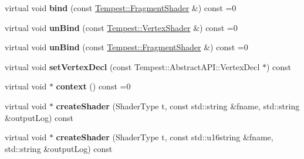 \begin{DoxyCompactItemize}
\item 
\hypertarget{class_tempest_1_1_abstract_shading_lang_accc0e1d115d2be9b627115e394c124c5}{virtual void {\bfseries bind} (const \hyperlink{class_tempest_1_1_fragment_shader}{Tempest\+::\+Fragment\+Shader} \&) const =0}\label{class_tempest_1_1_abstract_shading_lang_accc0e1d115d2be9b627115e394c124c5}

\item 
\hypertarget{class_tempest_1_1_abstract_shading_lang_a9b79bf98a809156da16fa6ad99fddc25}{virtual void {\bfseries un\+Bind} (const \hyperlink{class_tempest_1_1_vertex_shader}{Tempest\+::\+Vertex\+Shader} \&) const =0}\label{class_tempest_1_1_abstract_shading_lang_a9b79bf98a809156da16fa6ad99fddc25}

\item 
\hypertarget{class_tempest_1_1_abstract_shading_lang_a143ac0075977399a8613974446fcefe8}{virtual void {\bfseries un\+Bind} (const \hyperlink{class_tempest_1_1_fragment_shader}{Tempest\+::\+Fragment\+Shader} \&) const =0}\label{class_tempest_1_1_abstract_shading_lang_a143ac0075977399a8613974446fcefe8}

\item 
\hypertarget{class_tempest_1_1_abstract_shading_lang_a58477d41043ece8bab348cb84b986ab2}{virtual void {\bfseries set\+Vertex\+Decl} (const Tempest\+::\+Abstract\+A\+P\+I\+::\+Vertex\+Decl $\ast$) const }\label{class_tempest_1_1_abstract_shading_lang_a58477d41043ece8bab348cb84b986ab2}

\item 
\hypertarget{class_tempest_1_1_abstract_shading_lang_a9ee31674de9ef0299e1ebd8d229b5132}{virtual void $\ast$ {\bfseries context} () const =0}\label{class_tempest_1_1_abstract_shading_lang_a9ee31674de9ef0299e1ebd8d229b5132}

\item 
\hypertarget{class_tempest_1_1_abstract_shading_lang_aaa3bd33dacb694063d0fcade2f9ee1d3}{virtual void $\ast$ {\bfseries create\+Shader} (Shader\+Type t, const std\+::string \&fname, std\+::string \&output\+Log) const }\label{class_tempest_1_1_abstract_shading_lang_aaa3bd33dacb694063d0fcade2f9ee1d3}

\item 
\hypertarget{class_tempest_1_1_abstract_shading_lang_af7189d53ab32d39e6276ee108ba7dd82}{virtual void $\ast$ {\bfseries create\+Shader} (Shader\+Type t, const std\+::u16string \&fname, std\+::string \&output\+Log) const }\label{class_tempest_1_1_abstract_shading_lang_af7189d53ab32d39e6276ee108ba7dd82}


\end{DoxyCompactItemize}
